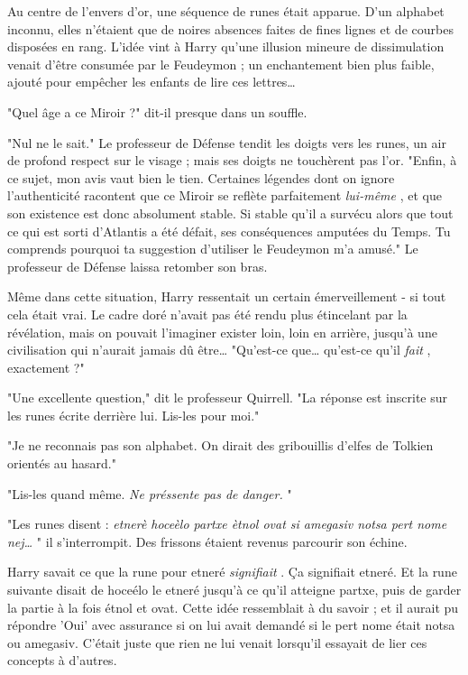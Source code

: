 Au centre de l'envers d'or, une séquence de runes était apparue. D'un alphabet inconnu, elles n'étaient que de noires absences faites de fines lignes et de courbes disposées en rang. L'idée vint à Harry qu'une illusion mineure de dissimulation venait d'être consumée par le Feudeymon ; un enchantement bien plus faible, ajouté pour empêcher les enfants de lire ces lettres…

"Quel âge a ce Miroir ?" dit-il presque dans un souffle.

"Nul ne le sait." Le professeur de Défense tendit les doigts vers les runes, un air de profond respect sur le visage ; mais ses doigts ne touchèrent pas l'or. "Enfin, à ce sujet, mon avis vaut bien le tien. Certaines légendes dont on ignore l'authenticité racontent que ce Miroir se reflète parfaitement \emph{lui-même} , et que son existence est donc absolument stable. Si stable qu'il a survécu alors que tout ce qui est sorti d'Atlantis a été défait, ses conséquences amputées du Temps. Tu comprends pourquoi ta suggestion d'utiliser le Feudeymon m'a amusé." Le professeur de Défense laissa retomber son bras.

Même dans cette situation, Harry ressentait un certain émerveillement - si tout cela était vrai. Le cadre doré n'avait pas été rendu plus étincelant par la révélation, mais on pouvait l'imaginer exister loin, loin en arrière, jusqu'à une civilisation qui n'aurait jamais dû être… "Qu'est-ce que… qu'est-ce qu'il \emph{fait} , exactement ?"

"Une excellente question," dit le professeur Quirrell. "La réponse est inscrite sur les runes écrite derrière lui. Lis-les pour moi."

"Je ne reconnais pas son alphabet. On dirait des gribouillis d'elfes de Tolkien orientés au hasard."

"Lis-les quand même. \emph{Ne préssente pas de danger.} "

"Les runes disent : \emph{etnerè hoceèlo partxe ètnol ovat si amegasiv notsa pert nome nej…} " il s'interrompit. Des frissons étaient revenus parcourir son échine.

Harry savait ce que la rune pour etneré \emph{signifiait} . Ça signifiait etneré. Et la rune suivante disait de hoceélo le etneré jusqu'à ce qu'il atteigne partxe, puis de garder la partie à la fois étnol et ovat. Cette idée ressemblait à du savoir ; et il aurait pu répondre 'Oui' avec assurance si on lui avait demandé si le pert nome était notsa ou amegasiv. C'était juste que rien ne lui venait lorsqu'il essayait de lier ces concepts à d'autres.

